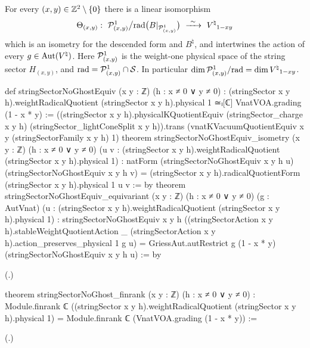 \begin{theorem}\label{ch18:thm:noghost}
For every $(x,y)\in{\mathbb{Z}}^2\setminus\{0\}$ there is a linear isomorphism
\begin{equation*}
  \Theta_{(x,y)}:\ \chXVIIIP^1_{(x,y)}\big/\mathrm{rad}\bigl(B|_{\chXVIIIP^1_{(x,y)}}\bigr)\ \xrightarrow{\ \sim\ }\ \Vnat_{1-xy}
\end{equation*}
which is an isometry for the descended form and $B^\natural$, and intertwines the action of every
$g\in\operatorname{Aut}({V^{\natural}})$.  Here $\mathcal{P}^1_{(x,y)}$ is the weight-one physical space of the string sector $H_{(x,y)}$, and
$\mathrm{rad}=\mathcal{P}^1_{(x,y)}\cap\mathcal{S}$.  In particular $\dim\mathcal{P}^1_{(x,y)}/\mathrm{rad}=\dim{V^{\natural}}_{1-xy}$.
\end{theorem}
\begin{leancode}
def stringSectorNoGhostEquiv (x y : ℤ) (h : x ≠ 0 ∨ y ≠ 0) :
    (stringSector x y h).weightRadicalQuotient (stringSector x y h).physical 1 ≃ₗ[ℂ]
      VnatVOA.grading (1 - x * y) :=
  ((stringSector x y h).physicalKQuotientEquiv (stringSector_charge x y h)
    (stringSector_lightConeSplit x y h)).trans
      (vnatKVacuumQuotientEquiv x y (stringSectorFamily x y h) 1)
theorem stringSectorNoGhostEquiv_isometry (x y : ℤ) (h : x ≠ 0 ∨ y ≠ 0)
    (u v : (stringSector x y h).weightRadicalQuotient (stringSector x y h).physical 1) :
    natForm (stringSectorNoGhostEquiv x y h u) (stringSectorNoGhostEquiv x y h v) =
      (stringSector x y h).radicalQuotientForm (stringSector x y h).physical 1 u v := by
theorem stringSectorNoGhostEquiv_equivariant (x y : ℤ) (h : x ≠ 0 ∨ y ≠ 0)
    (g : AutVnat)
    (u : (stringSector x y h).weightRadicalQuotient (stringSector x y h).physical 1) :
    stringSectorNoGhostEquiv x y h
      ((stringSectorAction x y h).stableWeightQuotientAction _
        (stringSectorAction x y h).action_preserves_physical 1 g u) =
      GriessAut.autRestrict g (1 - x * y) (stringSectorNoGhostEquiv x y h u) := by
\end{leancode}
(.)
\begin{leancode}
theorem stringSectorNoGhost_finrank (x y : ℤ) (h : x ≠ 0 ∨ y ≠ 0) :
    Module.finrank ℂ
      ((stringSector x y h).weightRadicalQuotient (stringSector x y h).physical 1) =
      Module.finrank ℂ (VnatVOA.grading (1 - x * y)) :=
\end{leancode}
(.)

